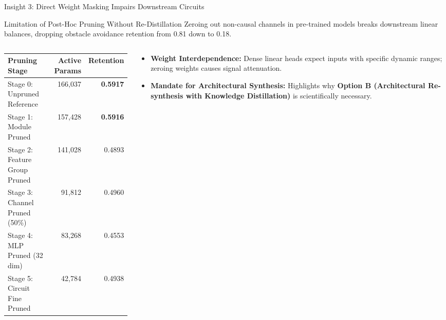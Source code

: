 \documentclass[aspectratio=169, 10pt]{beamer}
\begin{document}
\begin{frame}{Insight 3: Direct Weight Masking Impairs Downstream Circuits}
  \begin{block}{Limitation of Post-Hoc Pruning Without Re-Distillation}
    Zeroing out non-causal channels in pre-trained models breaks downstream linear balances, dropping obstacle avoidance retention from 0.81 down to 0.18.
  \end{block}
  \vspace{-0.2cm}
  \begin{columns}[T]
    \begin{column}{0.50\textwidth}
      \setlength{\tabcolsep}{4pt}
      \begin{table}
        \centering
        \scriptsize
        \begin{tabular}{lrr}
          \toprule
          \textbf{Pruning Stage} & \textbf{Active Params} & \textbf{Retention} \\
          \midrule
          Stage 0: Unpruned Reference & 166,037 & \textbf{0.5917} \\
          Stage 1: Module Pruned & 157,428 & \textbf{0.5916} \\
          Stage 2: Feature Group Pruned & 141,028 & 0.4893 \\
          Stage 3: Channel Pruned (50\%) & 91,812 & 0.4960 \\
          Stage 4: MLP Pruned (32 dim) & 83,268 & 0.4553 \\
          Stage 5: Circuit Fine Pruned & 42,784 & 0.4938 \\
          \bottomrule
        \end{tabular}
      \end{table}
    \end{column}
    \begin{column}{0.46\textwidth}
      \begin{itemize}
        \item \textbf{Weight Interdependence:} Dense linear heads expect inputs with specific dynamic ranges; zeroing weights causes signal attenuation.
        \item \textbf{Mandate for Architectural Synthesis:} Highlights why \textbf{Option B (Architectural Re-synthesis with Knowledge Distillation)} is scientifically necessary.
      \end{itemize}
    \end{column}
  \end{columns}
\end{frame}
\end{document}
